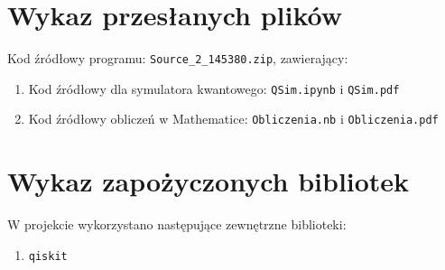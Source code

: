 \documentclass{article}
\begin{document}
\section{Wykaz przesłanych plików}
    Kod źródłowy programu: \verb+Source_2_145380.zip+, zawierający:
    \begin{enumerate}
        \item Kod źródłowy dla symulatora kwantowego: \verb+QSim.ipynb+ i \verb+QSim.pdf+
        \item Kod źródłowy obliczeń w Mathematice: \verb+Obliczenia.nb+ i \verb+Obliczenia.pdf+
        
    \end{enumerate}
\section{Wykaz zapożyczonych bibliotek}
W projekcie wykorzystano następujące zewnętrzne biblioteki:
    \begin{enumerate}
        \item \verb+qiskit+
    \end{enumerate}
\end{document}
